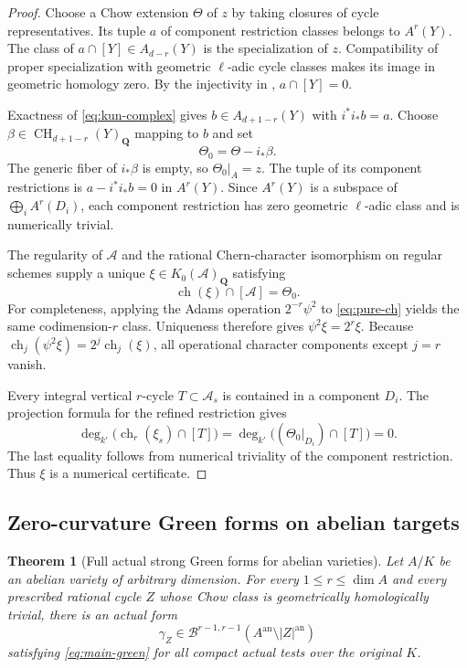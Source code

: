 \documentclass[11pt]{article}
\newtheorem{theorem}{Theorem}[section]
\theoremstyle{definition}
\theoremstyle{remark}
\numberwithin{equation}{section}
\newcommand{\CH}{\operatorname{CH}}
\newcommand{\an}{\mathrm{an}}
\newcommand{\B}{\mathcal B}
\begin{document}
\begin{proof}
Choose a Chow extension $\Theta$ of $z$ by taking closures of
cycle representatives.  Its tuple $a$ of component restriction
classes belongs to $A^r(Y)$.  The class of
$a\cap[Y]\in A_{d-r}(Y)$ is the specialization of $z$.
Compatibility of proper specialization with geometric
$\ell$-adic cycle classes makes its image in geometric homology
zero.  By the injectivity in ,
$a\cap[Y]=0$.

Exactness of \eqref{eq:kun-complex} gives
$b\in A_{d+1-r}(Y)$ with $i^*i_*b=a$.
Choose $\beta\in\CH_{d+1-r}(Y)_{\mathbf Q}$ mapping to $b$
and set
\[
                           \Theta_0=\Theta-i_*\beta.
\]
The generic fiber of $i_*\beta$ is empty, so $\Theta_0|_A=z$.
The tuple of its component restrictions is
$a-i^*i_*b=0$ in $A^r(Y)$.  Since $A^r(Y)$ is a subspace of
$\bigoplus_i A^r(D_i)$, each component restriction has zero
geometric $\ell$-adic class and is numerically trivial.

The regularity of $\mathcal A$ and the rational Chern-character
isomorphism on regular schemes
\cite[Tag 0FEY]{StacksFEY} supply a unique
$\xi\in K_0(\mathcal A)_{\mathbf Q}$ satisfying
\begin{equation}\label{eq:pure-ch}
                    \operatorname{ch}(\xi)\cap[\mathcal A]
                              =\Theta_0.
\end{equation}
For completeness, applying the Adams operation $2^{-r}\psi^2$
to \eqref{eq:pure-ch} yields the same codimension-$r$ class.
Uniqueness therefore gives $\psi^2\xi=2^r\xi$.
Because $\operatorname{ch}_j(\psi^2\xi)=2^j\operatorname{ch}_j(\xi)$,
all operational character components except $j=r$ vanish.

Every integral vertical $r$-cycle $T\subset\mathcal A_s$
is contained in a component $D_i$.  The projection formula for
the refined restriction gives
\[
 \deg_{k'}\bigl(\operatorname{ch}_r(\xi_s)\cap[T]\bigr)
 =\deg_{k'}\bigl((\Theta_0|_{D_i})\cap[T]\bigr)=0.
\]
The last equality follows from numerical triviality of the
component restriction.  Thus $\xi$ is a numerical certificate.
\end{proof}

\subsection{Zero-curvature Green forms on abelian targets}

\begin{theorem}[Full actual strong Green forms for abelian varieties]
\label{thm:abelian-G}
Let $A/K$ be an abelian variety of arbitrary dimension.  For
every $1\le r\le\dim A$ and every prescribed rational cycle $Z$
whose Chow class is geometrically homologically trivial, there is
an actual form
\[
 \gamma_Z\in\B^{r-1,r-1}
                    (A^{\an}\setminus|Z|^{\an})
\]
satisfying \eqref{eq:main-green} for all compact actual tests
over the original $K$.
\end{theorem}
\end{document}
